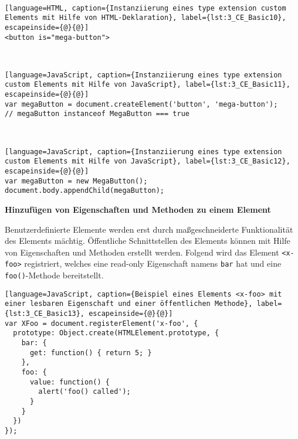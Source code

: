 \begin{enumerate}
 \hfill \\
\begin{lstlisting}[language=HTML, caption={Instanziierung eines type extension custom Elements mit Hilfe von HTML-Deklaration}, label={lst:3_CE_Basic10}, escapeinside={@}{@}]
<button is="mega-button">
\end{lstlisting}

 \hfill \\
\begin{lstlisting}[language=JavaScript, caption={Instanziierung eines type extension custom Elements mit Hilfe von JavaScript}, label={lst:3_CE_Basic11}, escapeinside={@}{@}]
var megaButton = document.createElement('button', 'mega-button');
// megaButton instanceof MegaButton === true
\end{lstlisting}

 \hfill \\
\begin{lstlisting}[language=JavaScript, caption={Instanziierung eines type extension custom Elements mit Hilfe von JavaScript}, label={lst:3_CE_Basic12}, escapeinside={@}{@}]
var megaButton = new MegaButton();
document.body.appendChild(megaButton);
\end{lstlisting}
\end{enumerate}

\textbf{Hinzufügen von Eigenschaften und Methoden zu einem Element}

Benutzerdefinierte Elemente werden erst durch maßgeschneiderte Funktionalität des Elements mächtig. Öffentliche Schnittstellen des Elements können mit Hilfe von Eigenschaften und Methoden erstellt werden. Folgend wird das Element \lstinline|<x-foo>| registriert, welches eine read-only Eigenschaft namens \lstinline|bar| hat und eine \lstinline|foo()|-Methode bereitstellt.

\begin{lstlisting}[language=JavaScript, caption={Beispiel eines Elements <x-foo> mit einer lesbaren Eigenschaft und einer öffentlichen Methode}, label={lst:3_CE_Basic13}, escapeinside={@}{@}]
var XFoo = document.registerElement('x-foo', {
  prototype: Object.create(HTMLElement.prototype, {
    bar: {
      get: function() { return 5; }
    },
    foo: {
      value: function() {
        alert('foo() called');
      }
    }
  })
});
\end{lstlisting}

